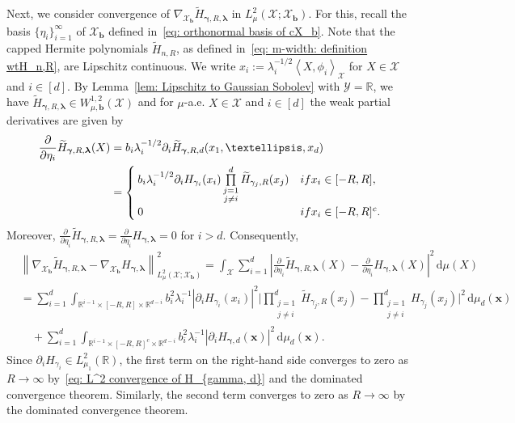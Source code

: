 \documentclass[namedate,webpdf]{ima-authoring-template-blank}
\def\D{\,\mathrm{d}}
\newcommand*{\nm}[1]{{\left\|#1\right \|}}
\newcommand{\abs}[1]{\left|#1\right|}
\newcommand{\absd}[1]{|#1|}    %
\newcommand*{\ip}[2]{\left\langle #1, #2 \right\rangle}
\numberwithin{counter}{section}
\numberwithin{equation}{section}
\theoremstyle{plain}
\theoremstyle{definition}
\newcommand*{\cX}{\mathcal{X}}
\newcommand*{\cY}{\mathcal{Y}}
\newcommand*{\bbR}{\mathbb{R}}
\newcommand*{\wtH}{\widetilde{H}}
\theoremstyle{thmstyletwo}
\begin{document}
Next, we consider convergence of \(\nabla_{\cX_{\bm{b}}}\wtH_{\bm{\gamma}, R, \bm{\lambda}}\) in \(L_{\mu}^2(\cX; \cX_{\bm{b}})\). For this, recall the basis \(\{\eta_i\}_{i=1}^{\infty}\) of \(\cX_{\bm{b}}\) defined in~\eqref{eq: orthonormal basis of cX_b}.
Note that the capped Hermite polynomials \(\wtH_{n, R}\), as defined in~\eqref{eq: m-width: definition wtH_n,R}, are Lipschitz continuous. We write \(x_i := \lambda_i^{-1/2} \ip{X}{\phi_i}_{\cX}\) for \(X \in \cX\) and \(i \in [d]\). By Lemma~\ref{lem: Lipschitz to Gaussian Sobolev} with \( \cY = \bbR \), we have \(\wtH_{\bm{\gamma}, R, \bm{\lambda}} \in W_{\mu, \bm{b}}^{1,2}(\cX)\) and for \(\mu\)-a.e. \(X \in \cX\) and \( i \in [d] \) the weak partial derivatives are given by
\begin{align*}
    \frac{\partial}{\partial \eta_i} \wtH_{\bm{\gamma}, R, \bm{\lambda}}(X) 
    &= b_i \lambda_i^{-1/2} \partial_i \wtH_{\bm{\gamma}, R, d}(x_1, \dots, x_d)\\
    &=
    \begin{cases}
        b_i \lambda_i^{-1/2} \partial_i H_{\gamma_i}(x_i) \prod\limits_{\substack{j = 1 \\ j \neq i}}^d \wtH_{\gamma_j, R}(x_j) & \textup{if } x_i\in [-R,R], \\
        0 & \textup{if } x_i \in [-R,R]^c.
    \end{cases}
\end{align*}
Moreover, \(\frac{\partial}{\partial \eta_i} \wtH_{\bm{\gamma}, R, \bm{\lambda}} = \frac{\partial}{\partial \eta_i} H_{\bm{\gamma}, \bm{\lambda}} = 0\) for \(i > d\). Consequently,
\begin{align*}
    &\nm{\nabla_{\cX_{\bm{b}}} \wtH_{\bm{\gamma}, R, \bm{\lambda}} - \nabla_{\cX_{\bm{b}}} H_{\bm{\gamma}, \bm{\lambda}}}_{L_{\mu}^2(\cX; \cX_{\bm{b}})}^2
    = \int_{\cX} \sum_{i = 1}^d \abs{\frac{\partial}{\partial \eta_i} \wtH_{\bm{\gamma}, R, \bm{\lambda}}(X) - \frac{\partial}{\partial \eta_i} H_{\bm{\gamma}, \bm{\lambda}}(X)}^2 \D \mu(X) \\
    & = \sum_{i = 1}^d \int_{\bbR^{i-1} \times [-R,R] \times \bbR^{d-i}} 
    b_i^2 \lambda_i^{-1} \absd{\partial_i H_{\gamma_i}(x_i)}^2 \bigg| \prod_{\substack{ j = 1 \\ j \neq i}}^d  \wtH_{\gamma_j, R}(x_j) - \prod_{\substack{ j = 1 \\ j \neq i}}^d H_{\gamma_j}(x_j) \bigg|^2 \D \mu_d(\bm{x}) \\
    & \quad + \sum_{i = 1}^d \int_{\bbR^{i-1} \times [-R,R]^c \times \bbR^{d-i}} 
    b_i^2 \lambda_i^{-1} \abs{\partial_i H_{\bm{\gamma}, d}(\bm{x})}^2 \D \mu_d(\bm{x}).
\end{align*}
Since \( \partial_i H_{\gamma_i} \in L^2_{\mu_1}(\bbR) \), the first term on the right-hand side converges to zero as \( R \to \infty \) by~\eqref{eq: L^2 convergence of H_{gamma, d}} and the dominated convergence theorem.
Similarly, the second term converges to zero as \(R \to \infty\) by the dominated convergence theorem. \hfill \qedsymbol{}
\end{document}
